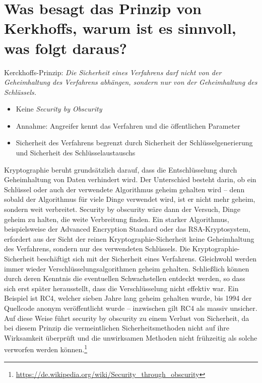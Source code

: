 \documentclass{article}
\begin{document}
	\section*{Was besagt das Prinzip von Kerkhoffs, warum ist es sinnvoll, was folgt daraus?}
	Kerckhoffs-Prinzip: \textit{Die Sicherheit eines Verfahrens darf nicht von der Geheimhaltung des Verfahrens abhängen, sondern nur von der Geheimhaltung des Schlüssels.}
	\begin{itemize}
		\item Keine \textit{Security by Obscurity}
		\item Annahme: Angreifer kennt das Verfahren und die öffentlichen Parameter
		\item Sicherheit des Verfahrens begrenzt durch Sicherheit der Schlüsselgenerierung und Sicherheit des Schlüs\-selaustauschs
	\end{itemize}
	Kryptographie beruht grundsätzlich darauf, dass die Entschlüsselung durch Geheimhaltung von Daten verhindert wird. Der Unterschied besteht darin, ob ein Schlüssel oder auch der verwendete Algorithmus geheim gehalten wird – denn sobald der Algorithmus für viele Dinge verwendet wird, ist er nicht mehr geheim, sondern weit verbreitet. Security by obscurity wäre dann der Versuch, Dinge geheim zu halten, die weite Verbreitung finden. Ein starker Algorithmus, beispielsweise der Advanced Encryption Standard oder das RSA-Kryptosystem, erfordert aus der Sicht der reinen Kryptographie-Sicherheit keine Geheimhaltung des Verfahrens, sondern nur des verwendeten Schlüssels. Die Kryptographie-Sicherheit beschäftigt sich mit der Sicherheit eines Verfahrens. Gleichwohl werden immer wieder Verschlüsselungsalgorithmen geheim gehalten. Schließlich können durch deren Kenntnis die eventuellen Schwachstellen entdeckt werden, so dass sich erst später herausstellt, dass die Verschlüsselung nicht effektiv war. Ein Beispiel ist RC4, welcher sieben Jahre lang geheim gehalten wurde, bis 1994 der Quellcode anonym veröffentlicht wurde – inzwischen gilt RC4 als massiv unsicher. Auf diese Weise führt security by obscurity zu einem Verlust von Sicherheit, da bei diesem Prinzip die vermeintlichen Sicherheitsmethoden nicht auf ihre Wirksamkeit überprüft und die unwirksamen Methoden nicht frühzeitig als solche verworfen werden können.\footnote{\url{https://de.wikipedia.org/wiki/Security_through_obscurity}}
	
\end{document}
